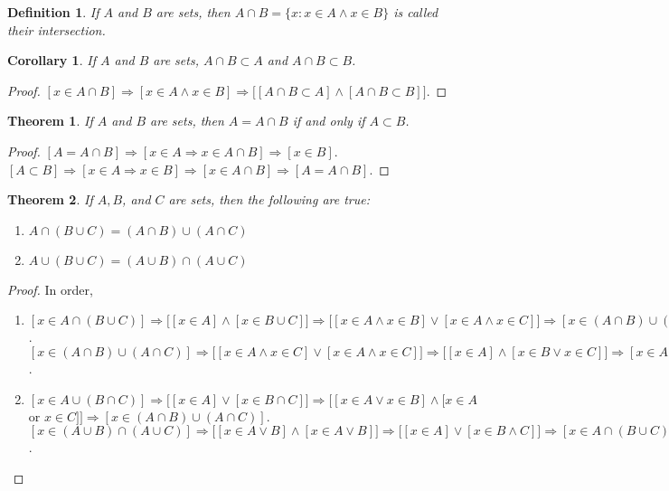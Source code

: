 \documentclass[crop=false,class=book]{standalone}
\theoremstyle{mystyle}
\newtheorem{theorem}{Theorem}[section]
\newtheorem{definition}{Definition}[section]
\newtheorem{corollary}{Corollary}[section]
\begin{document}
\begin{definition}
If $A$ and $B$ are sets, then $A\cap B = \{x:x\in A \land x\in B\}$ is called their intersection.
\end{definition}
\begin{corollary}
If $A$ and $B$ are sets, $A\cap B \subset A$ and $A\cap B \subset B$.
\end{corollary}
\begin{proof}
$[x\in A\cap B]\Rightarrow [x\in A\land x\in B]\Rightarrow \big[[A\cap B \subset A]\land [A\cap B \subset B]\big]$.
\end{proof}
\begin{theorem}
If $A$ and $B$ are sets, then $A=A\cap B$ if and only if $A\subset B$.
\end{theorem}
\begin{proof}
$[A=A\cap B]\Rightarrow [x\in A\Rightarrow x\in A \cap B]\Rightarrow [x\in B]$. $[A\subset B]\Rightarrow [x\in A\Rightarrow x\in B]\Rightarrow [x\in A\cap B]\Rightarrow [A=A\cap B]$.
\end{proof}
\begin{theorem}
If $A,B$, and $C$ are sets, then the following are true:
\begin{enumerate}
\item $A\cap (B\cup C) = (A\cap B)\cup (A\cap C)$
\item $A\cup (B\cup C) = (A\cup B)\cap (A\cup C)$
\end{enumerate}
\end{theorem}
\begin{proof}
In order,
\begin{enumerate}
\item $[x\in A\cap (B\cup C)]\Rightarrow \big[[x\in A] \land [x\in B\cup C]\big]\Rightarrow \big[[x\in A\land x\in B]\lor [x\in A\land x\in C]\big]\Rightarrow [x\in (A\cap B)\cup (A\cap C)]$. $[x\in (A\cap B)\cup(A\cap C)]\Rightarrow \big[[x\in A\land x\in C]\lor [x\in A \land x\in C]\big]\Rightarrow \big[[x\in A]\land [x\in B\lor x\in C]\big]\Rightarrow [x\in A\cap(B\cup C)]$.
\item $[x\in A\cup (B\cap C)]\Rightarrow \big[[x\in A]\lor [x\in B\cap C]\big] \Rightarrow \big[[x\in A \lor x\in B]\land [x\in A$ or $x\in C]\big]\Rightarrow [x\in (A\cap B)\cup (A\cap C)]$. $[x\in (A\cup B)\cap (A\cup C)]\Rightarrow \big[[x\in A\lor B]\land [x\in A\lor B]\big]\Rightarrow \big[[x\in A]\lor[x\in B\land C]\big]\Rightarrow [x\in A\cap(B\cup C)]$.
\end{enumerate}
\end{proof}
\end{document}
